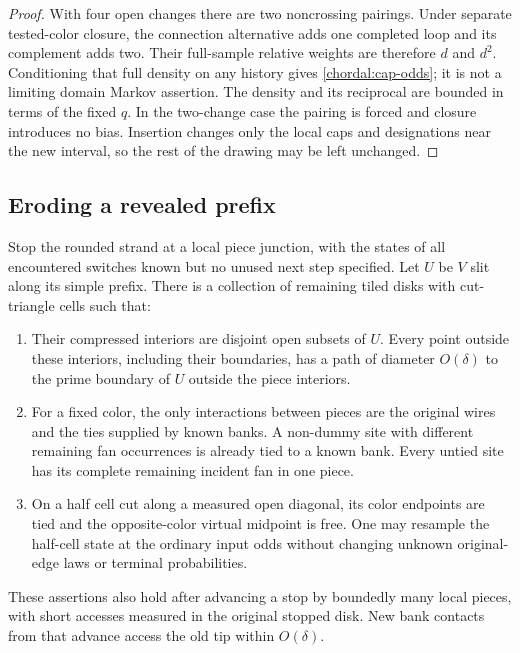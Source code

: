 \begin{proof}
With four open changes there are two noncrossing pairings.  Under
separate tested-color closure, the connection alternative adds one
completed loop and its complement adds two.  Their full-sample
relative weights are therefore $d$ and $d^2$.  Conditioning that
full density on any history gives \eqref{chordal:cap-odds}; it is
not a limiting domain Markov assertion.  The density and its
reciprocal are bounded in terms of the fixed $q$.  In the two-change
case the pairing is forced and closure introduces no bias.
Insertion changes only the local caps and designations near the
new interval, so the rest of the drawing may be left unchanged.
\end{proof}

\subsection{Eroding a revealed prefix}

\begin{lemma}\label{chordal:erosion}
Stop the rounded strand at a local piece junction, with the states
of all encountered switches known but no unused next step specified.
Let $U$ be $V$ slit along its simple prefix.  There is a collection
of remaining tiled disks with cut-triangle cells such that:
\begin{enumerate}[label=(\roman*)]
\item Their compressed interiors are disjoint open subsets of $U$.
Every point outside these interiors, including their boundaries,
has a path of diameter $O(\delta)$ to the prime boundary of $U$
outside the piece interiors.
\item For a fixed color, the only interactions between pieces are
the original wires and the ties supplied by known banks.  A
non-dummy site with different remaining fan occurrences is already
tied to a known bank.  Every untied site has its complete remaining
incident fan in one piece.
\item On a half cell cut along a measured open diagonal, its color
endpoints are tied and the opposite-color virtual midpoint is free.
One may resample the half-cell state at the ordinary input odds
without changing unknown original-edge laws or terminal probabilities.
\end{enumerate}
These assertions also hold after advancing a stop by boundedly many
local pieces, with short accesses measured in the original stopped
disk.  New bank contacts from that advance access the old tip within
$O(\delta)$.
\end{lemma}

